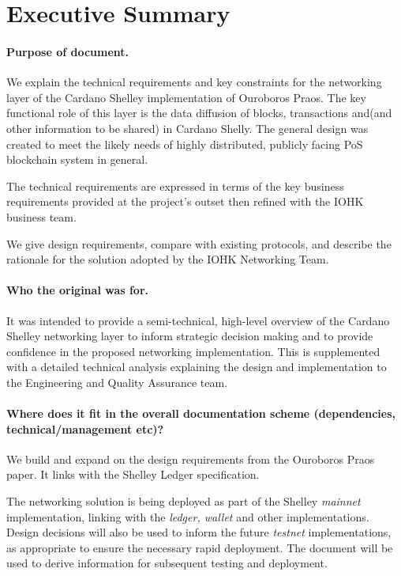 \documentclass[11pt,a4paper]{article}
\begin{document}
\section{Executive Summary}
\label{executive-summary}

\paragraph{Purpose of document.}

We explain the technical requirements and key constraints for the
networking layer of the Cardano Shelley implementation of Ouroboros
Praos. The key functional role of this layer is the data diffusion of
blocks, transactions and(and other information to be shared) in Cardano
Shelly. The general design was created to meet the likely needs of
highly distributed, publicly facing PoS blockchain system in general.

The technical requirements are expressed in terms of the key business
requirements provided at the project's outset then refined with the IOHK
business team.

We give design requirements, compare with existing protocols, and
describe the rationale for the solution adopted by the IOHK Networking
Team.

\paragraph{Who the original was for.}
It was intended to provide a semi-technical, high-level overview of the Cardano
Shelley networking layer to inform strategic decision making and to
provide confidence in the proposed networking implementation.
This is supplemented with a detailed technical analysis explaining the
design and implementation to the Engineering and Quality Assurance team.

\paragraph{Where does it fit in the overall documentation scheme
(dependencies, technical/management etc)?}

We build and expand on the design requirements from the Ouroboros Praos
paper. It links with the Shelley Ledger specification.

The networking solution is being deployed as part of the Shelley
\emph{mainnet} implementation, linking with the \emph{ledger, wallet}
and other implementations. Design decisions will also be used to inform
the future \emph{testnet} implementations, as appropriate to ensure the
necessary rapid deployment. The document will be used to derive
information for subsequent testing and deployment.
\end{document}
